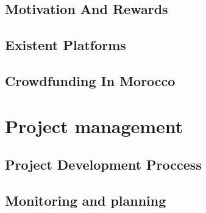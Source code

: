 \subsection*{ Motivation And Rewards }

\subsection*{ Existent Platforms }
\subsection*{ Crowdfunding In Morocco }


\section*{ Project management }
\subsection*{ Project Development Proccess } 
\subsection*{ Monitoring and planning }
